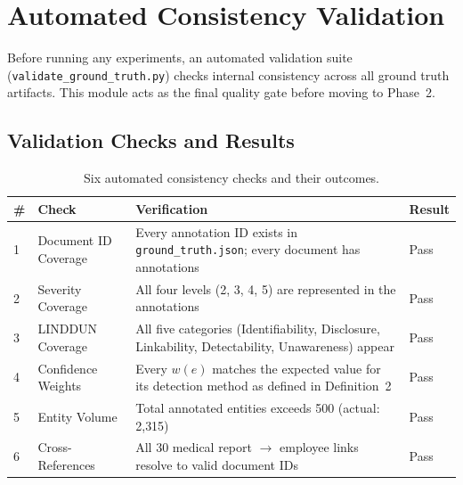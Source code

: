 \documentclass[12pt, a4paper]{article}
\begin{document}
\newpage
\section{Automated Consistency Validation}
\label{sec:validation}

Before running any experiments, an automated validation suite (\texttt{validate\_ground\_truth.py}) checks internal consistency across all ground truth artifacts. This module acts as the final quality gate before moving to Phase~2.

\subsection{Validation Checks and Results}

\begin{table}[H]
\centering
\caption{Six automated consistency checks and their outcomes.}
\label{tab:validation}
\small
{}
\begin{tabular}{C{0.7cm} L{3.8cm} L{6.8cm} C{1.5cm}}
\toprule
{}
\color{white}\textbf{\#} &
\color{white}\textbf{Check} &
\color{white}\textbf{Verification} &
\color{white}\textbf{Result} \\
 & Document ID Coverage    & Every annotation ID exists in \texttt{ground\_truth.json}; every document has annotations & Pass \\
2 & Severity Coverage       & All four levels (2, 3, 4, 5) are represented in the annotations & Pass \\
3 & LINDDUN Coverage        & All five categories (Identifiability, Disclosure, Linkability, Detectability, Unawareness) appear & Pass \\
4 & Confidence Weights      & Every $w(e)$ matches the expected value for its detection method as defined in Definition~2 & Pass \\
5 & Entity Volume           & Total annotated entities exceeds 500 (actual: 2{,}315) & Pass \\
6 & Cross-References        & All 30 medical report $\to$ employee links resolve to valid document IDs & Pass \\
\bottomrule
\end{tabular}
\end{table}
\end{document}
